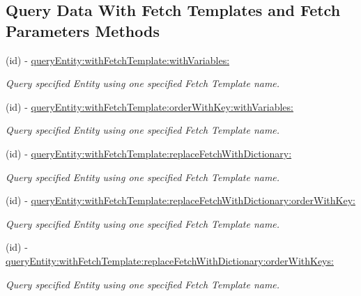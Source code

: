 \subsection*{Query Data With Fetch Templates and Fetch Parameters Methods}
\begin{DoxyCompactItemize}
\item 
(id) -\/ \hyperlink{interface_j_p_d_b_manager_action_aac56b1fa8bf99688b4ea5f117036eff0}{queryEntity:withFetchTemplate:withVariables:}
\begin{DoxyCompactList}\small\item\em Query specified Entity using one specified Fetch Template name. \item\end{DoxyCompactList}\item 
(id) -\/ \hyperlink{interface_j_p_d_b_manager_action_a3044583007eb7aa00185a5da222acc40}{queryEntity:withFetchTemplate:orderWithKey:withVariables:}
\begin{DoxyCompactList}\small\item\em Query specified Entity using one specified Fetch Template name. \item\end{DoxyCompactList}\item 
(id) -\/ \hyperlink{interface_j_p_d_b_manager_action_ae32ca03d7ce37116f5c9e292e368bf8f}{queryEntity:withFetchTemplate:replaceFetchWithDictionary:}
\begin{DoxyCompactList}\small\item\em Query specified Entity using one specified Fetch Template name. \item\end{DoxyCompactList}\item 
(id) -\/ \hyperlink{interface_j_p_d_b_manager_action_aef6b587a0260a962b3ba9946d5590997}{queryEntity:withFetchTemplate:replaceFetchWithDictionary:orderWithKey:}
\begin{DoxyCompactList}\small\item\em Query specified Entity using one specified Fetch Template name. \item\end{DoxyCompactList}\item 
(id) -\/ \hyperlink{interface_j_p_d_b_manager_action_ac04b76b32d39ae9b412f99b3ac620a86}{queryEntity:withFetchTemplate:replaceFetchWithDictionary:orderWithKeys:}
\begin{DoxyCompactList}\small\item\em Query specified Entity using one specified Fetch Template name. \item\end{DoxyCompactList}\item 

\end{DoxyCompactItemize}
